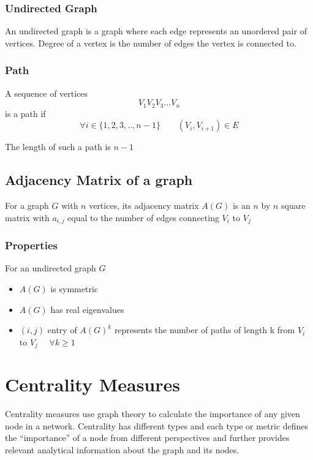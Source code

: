 \documentclass[12pt, a4paper]{article}
\begin{document}
        \subsubsection{Undirected Graph}
        An undirected graph is a graph where each edge represents an unordered pair of vertices. Degree of a vertex is the number of edges the vertex is connected to.

        \subsubsection{Path}
        \begin{flushleft}
        A sequence of vertices $$V_1V_2V_3...V_n$$ is a path if 
        $$\forall i \in \{1,2,3,..,n-1\} \qquad (V_{i}, V_{i+1}) \in E$$

        The length of such a path is $n-1$
        \end{flushleft}

      \subsection{Adjacency Matrix of a graph}
      For a graph $G$ with $n$ vertices, its adjacency matrix $A(G)$ is an $n$ by $n$ square matrix with $a_{i,j}$ equal to the number of edges connecting $V_i$ to $V_j$

        \subsubsection{Properties}
        For an undirected graph $G$
        \begin{itemize}
          \item $A(G)$ is symmetric 
          \item $A(G)$ has real eigenvalues
          \item $(i,j)$ entry of $A(G)^k$ represents the number of paths of length k from $V_i$ to $V_j$ $\quad \forall k \ge 1$
        \end{itemize}

    \section{Centrality Measures}
    Centrality measures use graph theory to calculate the importance of any given node in a network. Centrality has different types and each type or metric defines the “importance” of a node from different perspectives and further provides relevant analytical information about the graph and its nodes.\cite{Disney22}
\end{document}
